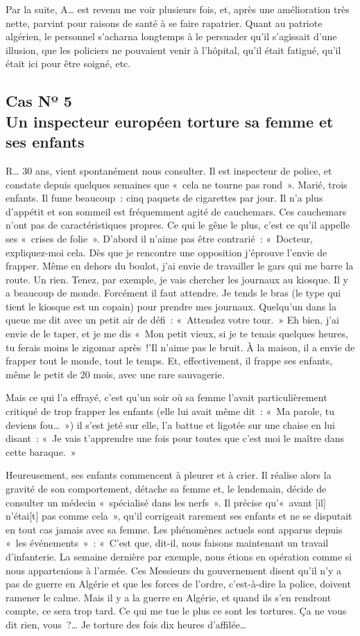 \documentclass[french,twoside]{book} %
\begin{document}
Par la suite, A… est revenu me voir plusieurs fois, et, après une amélioration très nette, parvint pour raisons de santé à se faire rapatrier. Quant au patriote algérien, le personnel s’acharna longtemps à le persuader qu’il s’agissait d’une illusion, que les policiers ne pouvaient venir à l’hôpital, qu’il était fatigué, qu’il était ici pour être soigné, etc.
\subsection[{Cas Nº 5. Un inspecteur européen torture sa femme et ses enfants}]{Cas Nº 5 \\
Un inspecteur européen torture sa femme et ses enfants}
\noindent R… 30 ans, vient spontanément nous consulter. Il est inspecteur de police, et constate depuis quelques semaines que « cela ne tourne pas rond ». Marié, trois enfants. Il fume beaucoup : cinq paquets de cigarettes par jour. Il n’a plus d’appétit et son sommeil est fréquemment agité de cauchemars. Ces cauchemars n’ont pas de caractéristiques propres. Ce qui le gêne le plus, c’est ce qu’il appelle ses « crises de folie ». D’abord il   n’aime pas être contrarié : « Docteur, expliquez-moi cela. Dès que je rencontre une opposition j’éprouve l’envie de frapper. Même en dehors du boulot, j’ai envie de travailler le gars qui me barre la route. Un rien. Tenez, par exemple, je vais chercher les journaux au kiosque. Il y a beaucoup de monde. Forcément il faut attendre. Je tends le bras (le type qui tient le kiosque est un copain) pour prendre mes journaux. Quelqu’un dans la queue me dit avec un petit air de défi : « Attendez votre tour. » Eh bien, j’ai envie de le taper, et je me dis « Mon petit vieux, si je te tenais quelques heures, tu ferais moins le zigomar après !’Il n’aime pas le bruit. À la maison, il a envie de frapper tout le monde, tout le temps. Et, effectivement, il frappe ses enfants, même le petit de 20 mois, avec une rare sauvagerie.\par
Mais ce qui l’a effrayé, c’est qu’un soir où sa femme l’avait particulièrement critiqué de trop frapper les enfants (elle lui avait même dit : « Ma parole, tu deviens fou… ») il s’est jeté sur elle, l’a battue et ligotée sur une chaise en lui disant : « Je vais t’apprendre une fois pour toutes que c’est moi le maître dans cette baraque. »\par
Heureusement, ses enfants commencent à pleurer et à crier. Il réalise alors la gravité de son comportement, détache sa femme et, le lendemain, décide de consulter un médecin « spécialisé dans les nerfs ». Il précise qu’« avant [il] n’étai[t] pas comme cela », qu’il corrigeait rarement ses enfants et ne se disputait en tout cas jamais avec sa femme. Les phénomènes actuels sont apparus depuis « les événements » : « C’est que, dit-il, nous faisons maintenant un travail d’infanterie. La semaine dernière par exemple, nous étions en opération comme si nous appartenions à l’armée. Ces Messieurs du gouvernement disent qu’il n’y a pas de guerre en Algérie et que les forces de l’ordre, c’est-à-dire la police, doivent ramener le calme. Mais il y a la guerre en Algérie, et quand ils s’en rendront compte, ce sera trop tard. Ce qui me tue le plus ce sont les tortures. Ça ne vous dit rien, vous ?… Je torture des fois dix heures d’affilée…\par
\end{document}
